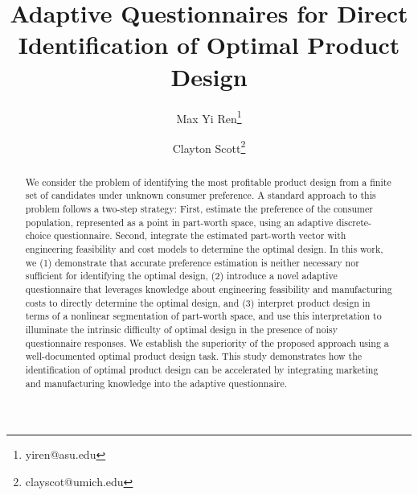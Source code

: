 \documentclass[onecolumn,11pt]{article}
\title{Adaptive Questionnaires for Direct Identification of Optimal Product Design}
\author[1]{Max Yi Ren\thanks{yiren@asu.edu}}
\author[2]{Clayton Scott\thanks{clayscot@umich.edu}}
\affil[1]{Department of Mechanical Engineering, Arizona State University}
\affil[2]{Division of Electrical and Computer Engineering, University of Michigan, Ann Arbor}
\newcommand{\highlight}[1]{{\textcolor{blue}{{#1}}}}
\newcommand{\commentfoot}[1]{\footnote{\textcolor{red}{\emph{Comment: #1}}}}
\newcommand{\commentfoot}[1]{}
\newcommand{\highlight}[1]{{{#1}}}
\begin{document}
\maketitle
\begin{abstract}
We consider the problem of identifying the most profitable product design from a finite set of candidates under unknown consumer preference. A standard approach to this problem follows a two-step strategy: First, estimate the preference of the consumer population, represented as a point in part-worth space, using an adaptive discrete-choice questionnaire. Second, integrate the estimated part-worth vector with engineering feasibility and cost models to determine the optimal design. In this work, we (1) demonstrate that accurate preference estimation is neither necessary nor sufficient for identifying the optimal design, (2) introduce a novel adaptive questionnaire that leverages knowledge about engineering feasibility and manufacturing costs to directly determine the optimal design, and (3) interpret product design in terms of a nonlinear segmentation of part-worth space, and use this interpretation to illuminate the intrinsic difficulty of optimal design in the presence of noisy questionnaire responses. We establish the superiority of the proposed approach using a well-documented optimal product design task. This study demonstrates how the identification of optimal product design can be accelerated by integrating marketing and manufacturing knowledge into the adaptive questionnaire.
\end{abstract}
\end{document}
